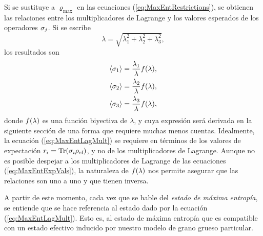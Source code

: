 Si se sustituye a $\varrho_{\max}$ en las ecuaciones (\ref{eq:MaxEntRestrictions}), se obtienen las relaciones entre los multiplicadores de Lagrange y los valores esperados de los operadores $\sigma_{j}$. Si se escribe 
\begin{equation}\label{eq:Ch2LagrangeNorm}
    \lambda=\sqrt{\lambda_{1}^{2}+\lambda_{2}^{2}+\lambda_{3}^{2}},\nonumber
\end{equation}
los resultados son
\begin{align}\label{eq:MaxEntExpVals}
    \begin{split}
    \expval{\sigma_{1}}&=\frac{\lambda_{1}}{\lambda}f(\lambda),\\
    \expval{\sigma_{2}}&=\frac{\lambda_{2}}{\lambda}f(\lambda),\\
    \expval{\sigma_{3}}&=\frac{\lambda_{3}}{\lambda}f(\lambda),
    \end{split}
\end{align}
donde $f(\lambda)$ es una función biyectiva de $\lambda$, y cuya expresión será derivada en la siguiente sección de una forma que requiere muchas menos cuentas. Idealmente, la ecuación (\ref{eq:MaxEntLagMult}) se requiere en términos de los valores de expectación $r_{i}=\Tr(\sigma_{i}\rho_{\text{ef}})$, y no de los multiplicadores de Lagrange. Aunque no es posible despejar a los multiplicadores de Lagrange de las ecuaciones (\ref{eq:MaxEntExpVals}), la naturaleza de $f(\lambda)$ nos permite asegurar que las relaciones son uno a uno y que tienen inversa.

A partir de este momento, cada vez que se hable del \textit{estado de máxima entropía}, se entiende que se hace referencia al estado dado por la ecuación (\ref{eq:MaxEntLagMult}). Esto es, al estado de máxima entropía que es compatible con un estado efectivo inducido por nuestro modelo de grano grueso particular.